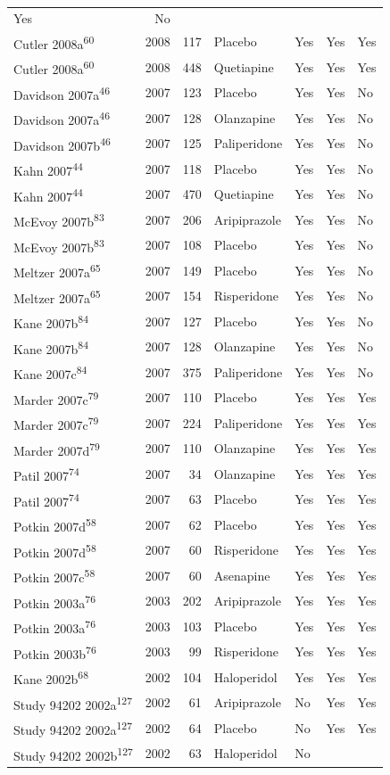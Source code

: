\documentclass[9pt,english,,jou,floatsintext]{apa6}
\begin{document}
\begin{longtable}[]{@{}lrrllll@{}}
Yes & No\tabularnewline
Cutler 2008a\textsuperscript{60} & 2008 & 117 & Placebo & Yes & Yes &
Yes\tabularnewline
Cutler 2008a\textsuperscript{60} & 2008 & 448 & Quetiapine & Yes & Yes &
Yes\tabularnewline
Davidson 2007a\textsuperscript{46} & 2007 & 123 & Placebo & Yes & Yes &
No\tabularnewline
Davidson 2007a\textsuperscript{46} & 2007 & 128 & Olanzapine & Yes & Yes
& No\tabularnewline
Davidson 2007b\textsuperscript{46} & 2007 & 125 & Paliperidone & Yes &
Yes & No\tabularnewline
Kahn 2007\textsuperscript{44} & 2007 & 118 & Placebo & Yes & Yes &
No\tabularnewline
Kahn 2007\textsuperscript{44} & 2007 & 470 & Quetiapine & Yes & Yes &
No\tabularnewline
McEvoy 2007b\textsuperscript{83} & 2007 & 206 & Aripiprazole & Yes & Yes
& No\tabularnewline
McEvoy 2007b\textsuperscript{83} & 2007 & 108 & Placebo & Yes & Yes &
No\tabularnewline
Meltzer 2007a\textsuperscript{65} & 2007 & 149 & Placebo & Yes & Yes &
No\tabularnewline
Meltzer 2007a\textsuperscript{65} & 2007 & 154 & Risperidone & Yes & Yes
& No\tabularnewline
Kane 2007b\textsuperscript{84} & 2007 & 127 & Placebo & Yes & Yes &
No\tabularnewline
Kane 2007b\textsuperscript{84} & 2007 & 128 & Olanzapine & Yes & Yes &
No\tabularnewline
Kane 2007c\textsuperscript{84} & 2007 & 375 & Paliperidone & Yes & Yes &
No\tabularnewline
Marder 2007c\textsuperscript{79} & 2007 & 110 & Placebo & Yes & Yes &
Yes\tabularnewline
Marder 2007c\textsuperscript{79} & 2007 & 224 & Paliperidone & Yes & Yes
& Yes\tabularnewline
Marder 2007d\textsuperscript{79} & 2007 & 110 & Olanzapine & Yes & Yes &
Yes\tabularnewline
Patil 2007\textsuperscript{74} & 2007 & 34 & Olanzapine & Yes & Yes &
Yes\tabularnewline
Patil 2007\textsuperscript{74} & 2007 & 63 & Placebo & Yes & Yes &
Yes\tabularnewline
Potkin 2007d\textsuperscript{58} & 2007 & 62 & Placebo & Yes & Yes &
Yes\tabularnewline
Potkin 2007d\textsuperscript{58} & 2007 & 60 & Risperidone & Yes & Yes &
Yes\tabularnewline
Potkin 2007c\textsuperscript{58} & 2007 & 60 & Asenapine & Yes & Yes &
Yes\tabularnewline
Potkin 2003a\textsuperscript{76} & 2003 & 202 & Aripiprazole & Yes & Yes
& Yes\tabularnewline
Potkin 2003a\textsuperscript{76} & 2003 & 103 & Placebo & Yes & Yes &
Yes\tabularnewline
Potkin 2003b\textsuperscript{76} & 2003 & 99 & Risperidone & Yes & Yes &
Yes\tabularnewline
Kane 2002b\textsuperscript{68} & 2002 & 104 & Haloperidol & Yes & Yes &
Yes\tabularnewline
Study 94202 2002a\textsuperscript{127} & 2002 & 61 & Aripiprazole & No &
Yes & Yes\tabularnewline
Study 94202 2002a\textsuperscript{127} & 2002 & 64 & Placebo & No & Yes
& Yes\tabularnewline
Study 94202 2002b\textsuperscript{127} & 2002 & 63 & Haloperidol & No &

\end{longtable}
\end{document}
